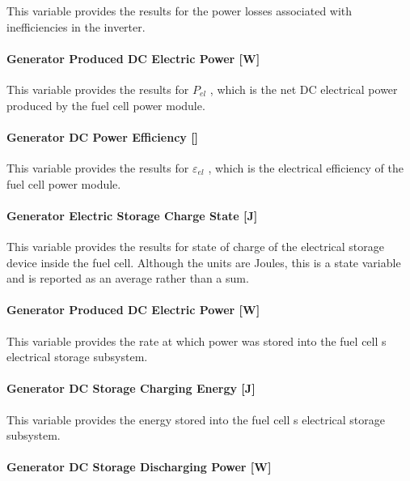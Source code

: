 This variable provides the results for the power losses associated with inefficiencies in the inverter.

\paragraph{Generator Produced DC Electric Power {[}W{]}}\label{generator-produced-dc-electric-power-w}

This variable provides the results for \({P_{el}}\) , which is the net DC electrical power produced by the fuel cell power module.

\paragraph{\texorpdfstring{Generator DC Power Efficiency {[]}}{Generator DC Power Efficiency }}\label{generator-dc-power-efficiency}

This variable provides the results for \({\varepsilon_{el}}\) , which is the electrical efficiency of the fuel cell power module.

\paragraph{Generator Electric Storage Charge State {[}J{]}}\label{generator-electric-storage-charge-state-j}

This variable provides the results for state of charge of the electrical storage device inside the fuel cell. Although the units are Joules, this is a state variable and is reported as an average rather than a sum.

\paragraph{Generator Produced DC Electric Power {[}W{]}}\label{generator-produced-dc-electric-power-w-1}

This variable provides the rate at which power was stored into the fuel cell s electrical storage subsystem.

\paragraph{Generator DC Storage Charging Energy {[}J{]}}\label{generator-dc-storage-charging-energy-j}

This variable provides the energy stored into the fuel cell s electrical storage subsystem.

\paragraph{Generator DC Storage Discharging Power {[}W{]}}\label{generator-dc-storage-discharging-power-w}


